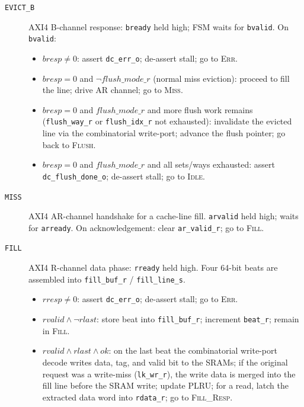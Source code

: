 \begin{description}
  \item[\texttt{EVICT\_B}]
    AXI4 B-channel response: \texttt{bready} held high; FSM waits for
    \texttt{bvalid}.
    On \texttt{bvalid}:
    \begin{itemize}
      \item $\mathit{bresp}{\neq}0$: assert \texttt{dc\_err\_o};
        de-assert stall; go to \textsc{Err}.
      \item $\mathit{bresp}{=}0$ and $\neg\mathit{flush\_mode\_r}$
        (normal miss eviction): proceed to fill the line; drive AR
        channel; go to \textsc{Miss}.
      \item $\mathit{bresp}{=}0$ and $\mathit{flush\_mode\_r}$ and
        more flush work remains (\texttt{flush\_way\_r} or
        \texttt{flush\_idx\_r} not exhausted): invalidate the evicted
        line via the combinatorial write-port; advance the flush
        pointer; go back to \textsc{Flush}.
      \item $\mathit{bresp}{=}0$ and $\mathit{flush\_mode\_r}$ and all
        sets/ways exhausted: assert \texttt{dc\_flush\_done\_o};
        de-assert stall; go to \textsc{Idle}.
    \end{itemize}

  \item[\texttt{MISS}]
    AXI4 AR-channel handshake for a cache-line fill.
    \texttt{arvalid} held high; waits for \texttt{arready}.
    On acknowledgement: clear \texttt{ar\_valid\_r}; go to \textsc{Fill}.

  \item[\texttt{FILL}]
    AXI4 R-channel data phase: \texttt{rready} held high.
    Four 64-bit beats are assembled into \texttt{fill\_buf\_r} /
    \texttt{fill\_line\_s}.
    \begin{itemize}
      \item $\mathit{rresp}{\neq}0$: assert \texttt{dc\_err\_o};
        de-assert stall; go to \textsc{Err}.
      \item $\mathit{rvalid}{\wedge}\neg\mathit{rlast}$: store beat into
        \texttt{fill\_buf\_r}; increment \texttt{beat\_r}; remain in
        \textsc{Fill}.
      \item $\mathit{rvalid}{\wedge}\mathit{rlast}{\wedge}\mathit{ok}$:
        on the last beat the combinatorial write-port decode writes
        data, tag, and valid bit to the SRAMs; if the original request
        was a write-miss (\texttt{lk\_wr\_r}), the write data is merged
        into the fill line before the SRAM write; update PLRU; for a
        read, latch the extracted data word into \texttt{rdata\_r};
        go to \textsc{Fill\_Resp}.
    \end{itemize}


\end{description}

